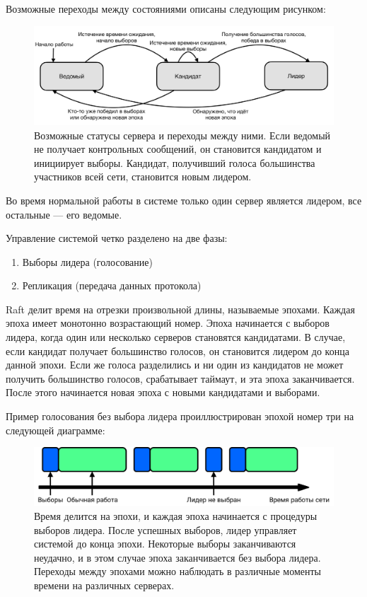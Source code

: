 \documentclass[subf, href, colorlinks=true, 14pt,
times, mtpro, specialist]{disser}
\theoremstyle{definition}
\begin{document}
Возможные переходы между состояниями описаны следующим рисунком:
\begin{figure}[H]
\centering
\includegraphics[width=1\textwidth]{src/pics/states.png}
\caption{Возможные статусы сервера и переходы между ними. Если ведомый не получает контрольных сообщений, он становится кандидатом и инициирует выборы. Кандидат, получивший голоса большинства участников всей сети, становится новым лидером.}
\label{fig:states}
\end{figure}

Во время нормальной работы в системе только один сервер является лидером, все остальные --- его ведомые.

Управление системой четко разделено на две фазы:
\begin{enumerate}
\item Выборы лидера (голосование)
\item Репликация (передача данных протокола)
\end{enumerate}

Raft делит время на отрезки произвольной длины, называемые эпохами. Каждая эпоха имеет монотонно возрастающий номер. Эпоха начинается с выборов лидера, когда один или несколько серверов становятся кандидатами. В случае, если кандидат получает большинство голосов, он становится лидером до конца данной эпохи. Если же голоса разделились и ни один из кандидатов не может получить большинство голосов, срабатывает таймаут, и эта эпоха заканчивается. После этого начинается новая эпоха с новыми кандидатами и выборами. 

\newpage
Пример голосования без выбора лидера проиллюстрирован эпохой номер три на следующей диаграмме:

\begin{figure}[H]
\centering
\vspace{0.4cm}
\hspace*{0.2cm}
\includegraphics[width=1\textwidth]{src/pics/terms.png}
\caption{Время делится на эпохи, и каждая эпоха начинается с процедуры выборов лидера. После успешных выборов, лидер управляет системой до конца эпохи. Некоторые выборы заканчиваются неудачно, и в этом случае эпоха заканчивается без выбора лидера. Переходы между эпохами можно наблюдать в различные моменты времени на различных серверах.}
\label{fig:terms}
\end{figure}
\end{document}
